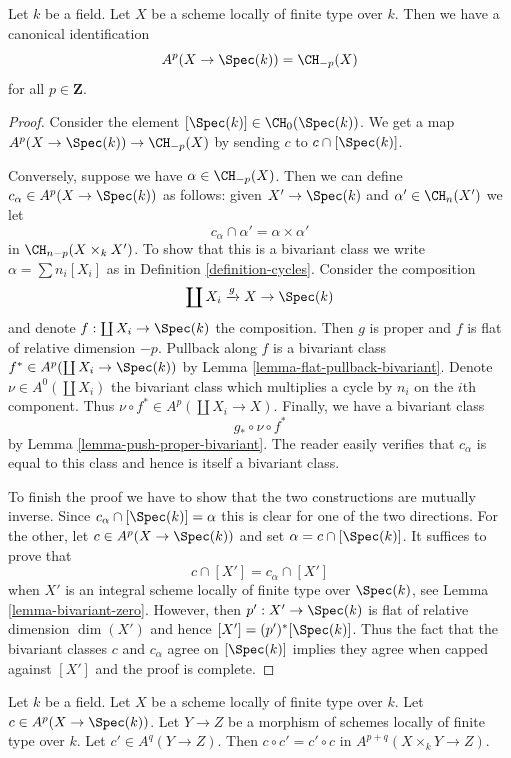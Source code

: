 \begin{lemma}
\label{lemma-chow-cohomology-towards-point}
Let $k$ be a field. Let $X$ be a scheme locally of finite type over $k$.
Then we have a canonical identification
$$
A^p(X \to \Spec(k)) = \CH_{-p}(X)
$$
for all $p \in \mathbf{Z}$.
\end{lemma}

\begin{proof}
Consider the element $[\Spec(k)] \in \CH_0(\Spec(k))$. We get a map
$A^p(X \to \Spec(k)) \to \CH_{-p}(X)$ by sending $c$ to $c \cap [\Spec(k)]$.

\medskip\noindent
Conversely, suppose we have $\alpha \in \CH_{-p}(X)$.
Then we can define $c_\alpha \in A^p(X \to \Spec(k))$ as
follows: given $X' \to \Spec(k)$ and $\alpha' \in \CH_n(X')$
we let
$$
c_\alpha \cap \alpha' = \alpha \times \alpha'
$$
in $\CH_{n - p}(X \times_k X')$. To show that this is a bivariant
class we write $\alpha = \sum n_i[X_i]$ as in
Definition \ref{definition-cycles}. Consider the composition
$$
\coprod X_i \xrightarrow{g} X \to \Spec(k)
$$
and denote $f : \coprod X_i \to \Spec(k)$ the composition.
Then $g$ is proper and $f$ is flat of relative dimension $-p$.
Pullback along $f$ is a bivariant class
$f^* \in A^p(\coprod X_i \to \Spec(k))$ by
Lemma \ref{lemma-flat-pullback-bivariant}.
Denote $\nu \in A^0(\coprod X_i)$ the bivariant class
which multiplies a cycle by $n_i$ on the $i$th component.
Thus $\nu \circ f^* \in A^p(\coprod X_i \to X)$.
Finally, we have a bivariant class
$$
g_* \circ \nu \circ f^*
$$
by Lemma \ref{lemma-push-proper-bivariant}. The reader easily
verifies that $c_\alpha$ is equal to this class and hence
is itself a bivariant class.

\medskip\noindent
To finish the proof we have to show that the two constructions
are mutually inverse. Since $c_\alpha \cap [\Spec(k)] = \alpha$
this is clear for one of the two directions. For the other, let
$c \in A^p(X \to \Spec(k))$ and set $\alpha = c \cap [\Spec(k)]$.
It suffices to prove that
$$
c \cap [X'] = c_\alpha \cap [X']
$$
when $X'$ is an integral scheme locally of finite type over $\Spec(k)$,
see Lemma \ref{lemma-bivariant-zero}. However, then $p' : X' \to \Spec(k)$
is flat of relative dimension $\dim(X')$ and hence
$[X'] = (p')^*[\Spec(k)]$. Thus the fact that the bivariant classes
$c$ and $c_\alpha$ agree on $[\Spec(k)]$ implies they
agree when capped against $[X']$ and the proof is complete.
\end{proof}

\begin{lemma}
\label{lemma-chow-cohomology-towards-point-commutes}
Let $k$ be a field. Let $X$ be a scheme locally of finite type over $k$.
Let $c \in A^p(X \to \Spec(k))$. Let $Y \to Z$ be a morphism of schemes
locally of finite type over $k$. Let $c' \in A^q(Y \to Z)$. Then
$c \circ c' = c' \circ c$ in $A^{p + q}(X \times_k Y \to Z)$.
\end{lemma}

